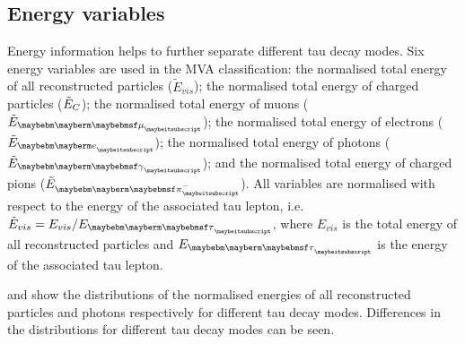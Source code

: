 \subsection{Energy variables}

Energy information helps to further separate different tau decay modes. Six energy variables are used in the MVA classification: the normalised total energy of all reconstructed particles ($\tilde{E}_{vis}$); the normalised total energy of charged particles ($\tilde{E}_{C}$); the normalised total energy of muons ($\tilde{E}_{\Pmu}$); the normalised total energy of electrons ($\tilde{E}_{\Pe}$); the normalised total energy of photons ($\tilde{E}_{\Pgg}$); and the normalised total energy of charged pions ($\tilde{E}_{\Pgpm}$). All variables are normalised with respect to the energy of the associated tau lepton, i.e. $\tilde{E}_{vis} = E_{vis} / E_{\Ptau}$, where $E_{vis} $ is the total energy of all reconstructed particles and $E_{\Ptau}$ is the energy of the associated tau lepton.


 and  show the distributions of the normalised energies of all reconstructed particles and photons respectively for different tau decay modes. Differences in the distributions for  different tau decay modes can be seen.



